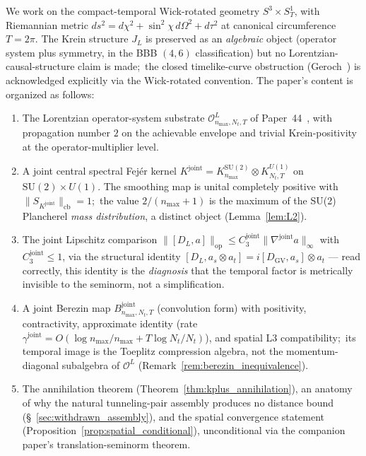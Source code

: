 \documentclass[11pt,a4paper]{article}
\theoremstyle{plain}
\theoremstyle{definition}
\newcommand{\nmax}{n_{\max}}
\newcommand{\Nt}{N_{t}}
\newcommand{\Manifold}{S^{3}\times S^{1}_{T}}
\newcommand{\Op}{\mathcal{O}}
\newcommand{\opnorm}[1]{\lVert #1 \rVert_{\mathrm{op}}}
\newcommand{\cbnorm}[1]{\lVert #1 \rVert_{\mathrm{cb}}}
\newcommand{\norm}[1]{\lVert #1 \rVert}
\newcommand{\SU}{\mathrm{SU}}
\newcommand{\Uone}{U(1)}
\newcommand{\DGV}{D_{\mathrm{GV}}}
\newcommand{\DL}{D_{L}}
\newcommand{\JL}{J_{L}}
\newcommand{\Bjoint}{B^{\mathrm{joint}}}
\newcommand{\Kjoint}{K^{\mathrm{joint}}}
\newcommand{\KSU}{K^{\SU(2)}}
\newcommand{\KU}{K^{\Uone}}
\newcommand{\gammajoint}{\gamma^{\mathrm{joint}}}
\newcommand{\Cthreejoint}{C_{3}^{\mathrm{joint}}}
\begin{document}
We work on the compact-temporal Wick-rotated geometry $\Manifold$,
with Riemannian metric $ds^{2} = d\chi^{2} + \sin^{2}\chi\,d\Omega^{2}
+ d\tau^{2}$ at canonical circumference $T = 2\pi$. The Krein structure
$\JL$ is preserved as an \emph{algebraic} object (operator system plus
symmetry, in the BBB $(4, 6)$ classification) but no
Lorentzian-causal-structure claim is made;\ the closed timelike-curve
obstruction (Geroch~\cite{geroch1967}) is acknowledged explicitly via
the Wick-rotated convention. The paper's content is organized as
follows:
\begin{enumerate}
\item[(L1$'$)] The Lorentzian operator-system substrate
$\Op^{L}_{\nmax,\Nt,T}$ of Paper~44~\cite{paper44}, with propagation
number $2$ on the achievable envelope and trivial Krein-positivity at
the operator-multiplier level.
\item[(L2)] A joint central spectral Fej\'er kernel
$\Kjoint = \KSU_{\nmax} \otimes \KU_{\Nt,T}$ on $\SU(2) \times \Uone$.
The smoothing map is unital completely positive with
$\cbnorm{S_{\Kjoint}} = 1$;\ the value $2/(\nmax+1)$ is the maximum
of the SU(2) Plancherel \emph{mass distribution}, a distinct object
(Lemma~\ref{lem:L2}).
\item[(L3)] The joint Lipschitz comparison
$\opnorm{[\DL, a]} \le \Cthreejoint \norm{\nabla^{\mathrm{joint}} a}_{\infty}$
with $\Cthreejoint \le 1$, via the structural identity
$[\DL, a_{s} \otimes a_{t}] = i[\DGV, a_{s}] \otimes a_{t}$ — read
correctly, this identity is the \emph{diagnosis} that the temporal
factor is metrically invisible to the seminorm, not a simplification.
\item[(L4)] A joint Berezin map $\Bjoint_{\nmax,\Nt,T}$ (convolution
form) with positivity, contractivity, approximate identity (rate
$\gammajoint = O(\log\nmax/\nmax + T\log\Nt/\Nt)$), and spatial L3
compatibility;\ its temporal image is the Toeplitz compression
algebra, not the momentum-diagonal subalgebra of $\Op^{L}$
(Remark~\ref{rem:berezin_inequivalence}).
\item[(Main)] The annihilation theorem
(Theorem~\ref{thm:kplus_annihilation}), an anatomy of why the
natural tunneling-pair assembly produces no distance bound
(\S~\ref{sec:withdrawn_assembly}), and the spatial convergence
statement (Proposition~\ref{prop:spatial_conditional}), unconditional
via the companion paper's translation-seminorm theorem.
\end{enumerate}
\end{document}
